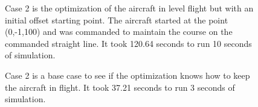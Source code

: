 \documentclass[letterpaper, 10 pt, conference]{ieeeconf}  %
\begin{document}
\begin{figure}[htbp]
	\centering
	\qquad
	\caption{Case 2 is the optimization of the aircraft in level flight but with an initial offset starting point. The aircraft started at the point (0,-1,100) and was commanded to maintain the course on the commanded straight line. It took 120.64 seconds to run 10 seconds of simulation.}
	\label{fig:fw_offset}
\end{figure}


\begin{figure}[htbp]
	\centering
	\qquad
	\caption{Case 2 is a base case to see if the optimization knows how to keep the aircraft in  flight. It took 37.21 seconds to run 3 seconds of simulation.}
	\label{fig:fw_circle}
\end{figure}
\end{document}
